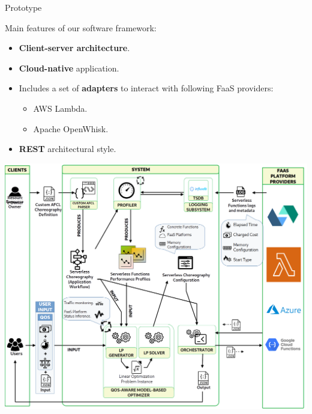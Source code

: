 \documentclass[13.5pt]{beamer}
\newcommand{\B}[1]{\textcolor{TorVergataColor}{\textbf{#1}}}
\begin{document}
\begin{frame}{Prototype}
	
	Main features of our software framework:
	\vspace{\baselineskip}
	\begin{itemize}
		\item \B{Client-server architecture}.
		\item \B{Cloud-native} application.
		\item Includes a set of \B{adapters} to interact with following FaaS providers:
		\begin{itemize}
			\item AWS Lambda.
			\item Apache OpenWhisk.
		\end{itemize}
		\item \B{REST} architectural style.
	\end{itemize}
	
\end{frame} 
\begin{frame}
	
	\begin{center}
		\includegraphics[width=\textwidth,height=0.95\textheight]{../Images/SystemForSlide.png}
	\end{center}
	
	
\end{frame} 
\end{document}
